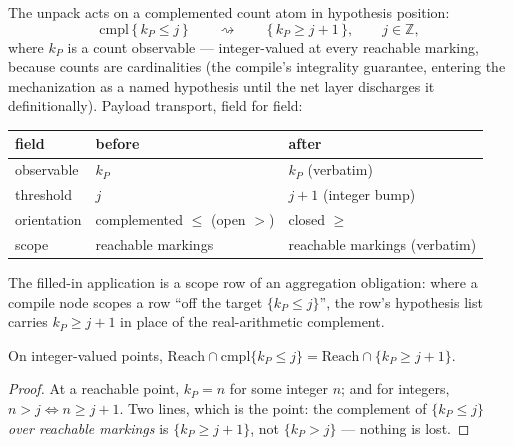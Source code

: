 

\begin{brecipe}\label{rec:car-unpack}
The unpack acts on a complemented count atom in hypothesis position:
\[
\mathrm{cmpl}\,\{\, k_P \leq j \,\}
\qquad\rightsquigarrow\qquad
\{\, k_P \geq j + 1 \,\},
\qquad j \in \mathbb{Z},
\]
where $k_P$ is a count observable --- integer-valued at every reachable
marking, because counts are cardinalities (the compile's integrality
guarantee, entering the mechanization as a named hypothesis until the
net layer discharges it definitionally). Payload transport, field for
field:
\begin{center}\small
\begin{tabular}{@{}lll@{}}
\textbf{field} & \textbf{before} & \textbf{after}\\
\midrule
observable & $k_P$ & $k_P$ (verbatim)\\
threshold & $j$ & $j + 1$ (integer bump)\\
orientation & complemented $\leq$ (open $>$) & closed $\geq$\\
scope & reachable markings & reachable markings (verbatim)\\
\end{tabular}
\end{center}
The filled-in application is a scope row of an aggregation obligation:
where a compile node scopes a row ``off the target $\{k_P \leq j\}$'',
the row's hypothesis list carries $k_P \geq j + 1$ in place of the
real-arithmetic complement.
\end{brecipe}

\begin{bprop}\label{prop:car-eq}
On integer-valued points,
$\mathrm{Reach} \cap \mathrm{cmpl}\{k_P \leq j\}
= \mathrm{Reach} \cap \{k_P \geq j + 1\}$.
\end{bprop}
\begin{proof}
At a reachable point, $k_P = n$ for some integer $n$; and for integers,
$n > j \iff n \geq j + 1$. Two lines, which is the point: the
complement of $\{k_P \leq j\}$ \emph{over reachable markings} is
$\{k_P \geq j+1\}$, not $\{k_P > j\}$ --- nothing is lost.
\end{proof}

